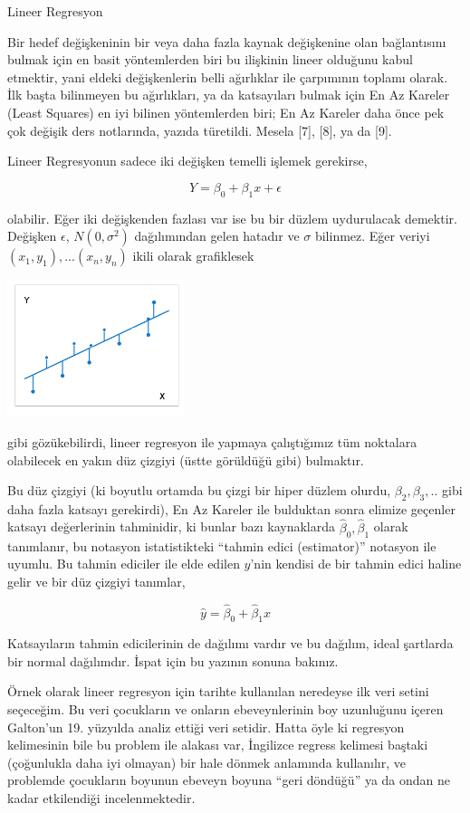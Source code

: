 \documentclass[12pt,fleqn]{article}\usepackage{../../common}
\begin{document}
Lineer Regresyon

Bir hedef değişkeninin bir veya daha fazla kaynak değişkenine olan
bağlantısını bulmak için en basit yöntemlerden biri bu ilişkinin lineer
olduğunu kabul etmektir, yani eldeki değişkenlerin belli ağırlıklar ile
çarpımının toplamı olarak. İlk başta bilinmeyen bu ağırlıkları, ya da
katsayıları bulmak için En Az Kareler (Least Squares) en iyi bilinen
yöntemlerden biri; En Az Kareler daha önce pek çok değişik ders notlarında,
yazıda türetildi. Mesela [7], [8], ya da [9].

Lineer Regresyonun sadece iki değişken temelli işlemek gerekirse, 

$$ Y = \beta_0 + \beta_1 x + \epsilon$$

olabilir. Eğer iki değişkenden fazlası var ise bu bir düzlem uydurulacak
demektir. Değişken $\epsilon$, $N(0,\sigma^2)$ dağılımından gelen hatadır
ve $\sigma$ bilinmez. Eğer veriyi $(x_1,y_1),...(x_n,y_n)$ ikili olarak
grafiklesek

\includegraphics[height=4cm]{stat_linreg_02.png}

gibi gözükebilirdi, lineer regresyon ile yapmaya çalıştığımız tüm noktalara
olabilecek en yakın düz çizgiyi (üstte görüldüğü gibi) bulmaktır. 

Bu düz çizgiyi (ki boyutlu ortamda bu çizgi bir hiper düzlem olurdu,
$\beta_2,\beta_3,..$ gibi daha fazla katsayı gerekirdi), En Az Kareler ile
bulduktan sonra elimize geçenler katsayı değerlerinin tahminidir, ki bunlar
bazı kaynaklarda $\hat{\beta}_0,\hat{\beta}_1$ olarak tanımlanır, bu
notasyon istatistikteki ``tahmin edici (estimator)'' notasyon ile
uyumlu. Bu tahmin ediciler ile elde edilen $y$'nin kendisi de bir tahmin
edici haline gelir ve bir düz çizgiyi tanımlar,

$$ \hat{y} = \hat{\beta}_0 + \hat{\beta}_1x $$

Katsayıların tahmin edicilerinin de dağılımı vardır ve bu dağılım, ideal
şartlarda bir normal dağılımdır. İspat için bu yazının sonuna bakınız. 

Örnek olarak lineer regresyon için tarihte kullanılan neredeyse ilk veri
setini seçeceğim. Bu veri çocukların ve onların ebeveynlerinin boy
uzunluğunu içeren Galton'un 19. yüzyılda analiz ettiği veri setidir. Hatta
öyle ki regresyon kelimesinin bile bu problem ile alakası var, İngilizce
regress kelimesi baştaki (çoğunlukla daha iyi olmayan) bir hale dönmek
anlamında kullanılır, ve problemde çocukların boyunun ebeveyn boyuna ``geri
döndüğü'' ya da ondan ne kadar etkilendiği incelenmektedir.
\end{document}
